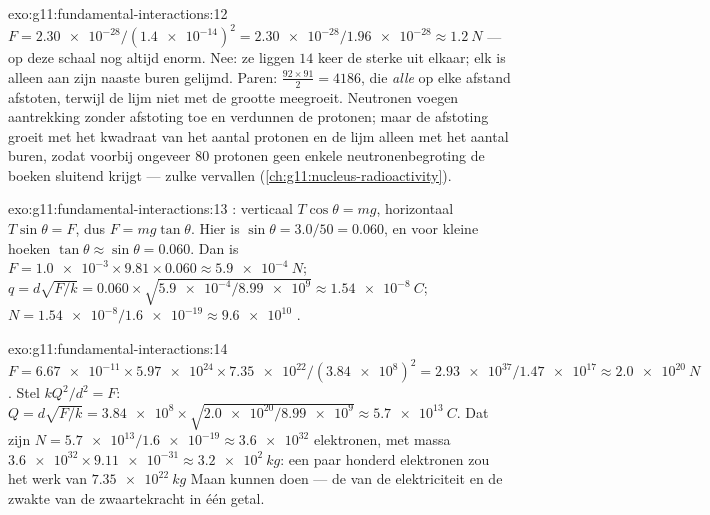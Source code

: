 \begin{solution}{exo:g11:fundamental-interactions:12}
$F = \num{2.30e-28}/(\num{1.4e-14})^2 = \num{2.30e-28}/\num{1.96e-28}
\approx \qty{1.2}{N}$ --- op deze schaal nog altijd enorm. Nee: ze liggen
$14$ keer de sterke  uit elkaar; elk is alleen aan zijn naaste
buren gelijmd. Paren: $\frac{92 \times 91}{2} = 4186$, die \emph{alle}
op elke afstand afstoten, terwijl de lijm niet met de grootte meegroeit.
Neutronen voegen aantrekking zonder afstoting toe en verdunnen de
protonen; maar de afstoting groeit met het kwadraat van het aantal
protonen en de lijm alleen met het aantal buren, zodat voorbij ongeveer
$80$ protonen geen enkele neutronenbegroting de boeken sluitend krijgt
--- zulke  vervallen
(\cref{ch:g11:nucleus-radioactivity}).
\end{solution}

\begin{solution}{exo:g11:fundamental-interactions:13}
: verticaal $T\cos\theta = mg$, horizontaal $T\sin\theta = F$,
dus $F = mg\tan\theta$. Hier is $\sin\theta = 3.0/50 = 0.060$, en voor
kleine hoeken $\tan\theta \approx \sin\theta = 0.060$. Dan is
$F = \num{1.0e-3} \times 9.81 \times 0.060 \approx \qty{5.9e-4}{N}$;
$q = d\sqrt{F/k} = 0.060 \times \sqrt{\num{5.9e-4}/\num{8.99e9}}
\approx \qty{1.54e-8}{C}$; $N = \num{1.54e-8}/\num{1.6e-19} \approx
\num{9.6e10}$ .
\end{solution}

\begin{solution}{exo:g11:fundamental-interactions:14}
$F = \num{6.67e-11} \times \num{5.97e24} \times \num{7.35e22} /
(\num{3.84e8})^2 = \num{2.93e37}/\num{1.47e17} \approx \qty{2.0e20}{N}$.
Stel $kQ^2/d^2 = F$:
$Q = d\sqrt{F/k} = \num{3.84e8} \times \sqrt{\num{2.0e20}/\num{8.99e9}}
\approx \qty{5.7e13}{C}$. Dat zijn
$N = \num{5.7e13}/\num{1.6e-19} \approx \num{3.6e32}$ elektronen, met
massa $\num{3.6e32} \times \num{9.11e-31} \approx \qty{3.2e2}{kg}$: een
paar honderd  elektronen zou het werk van $\qty{7.35e22}{kg}$
Maan kunnen doen --- de  van de elektriciteit en de zwakte van de
zwaartekracht in één getal.
\end{solution}

